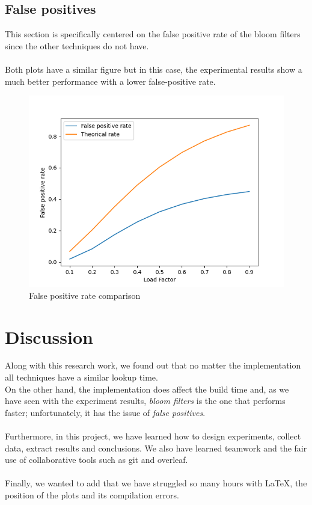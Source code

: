 \documentclass{article}
\begin{document}
    \subsection*{False positives}
        This section is specifically centered on the false positive rate of the bloom filters since the other techniques do not have. \\\\
        Both plots have a similar figure but in this case, the experimental results show a much better performance with a lower false-positive rate. 
        
        \begin{figure}[H]
        \begin{center}
          \includegraphics[width=\linewidth]{images/loadFactor_vs_falsePositives.png}
          \caption{False positive rate comparison}\label{fig:plot16}
        \endminipage
        \end{center}
        \end{figure}

\section{Discussion}
Along with this research work, we found out that no matter the implementation all techniques have a similar lookup time. \\
On the other hand, the implementation does affect the build time and, as we have seen with the experiment results, \textit{bloom filters} is the one that performs faster; unfortunately, it has the issue of \textit{false positives}. \\\\
Furthermore, in this project, we have learned how to design experiments, collect data, extract results and conclusions. We also have learned teamwork and the fair use of collaborative tools such as git and overleaf. \\\\
Finally, we wanted to add that we have struggled so many hours with LaTeX, the position of the plots and its compilation errors.


    \printbibliography
\end{document}
